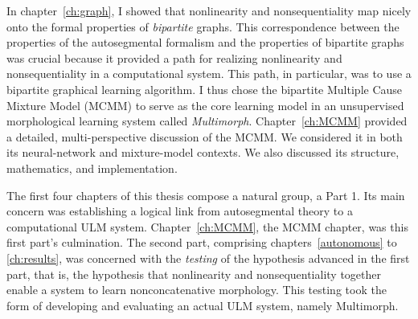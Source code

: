 In chapter~\ref{ch:graph}, I showed that nonlinearity 
and nonsequentiality map nicely onto the formal properties of \emph{bipartite} graphs.
This correspondence between the properties of the autosegmental formalism and the properties of bipartite graphs was crucial because it provided a path for realizing nonlinearity 
and nonsequentiality in a computational system. This path, in particular, was to use a bipartite graphical learning algorithm. I thus chose the bipartite Multiple Cause Mixture Model (MCMM) \citep{saund:94} to serve as the core learning model in an unsupervised morphological learning system called \emph{Multimorph}. Chapter~\ref{ch:MCMM} provided a detailed, multi-perspective discussion of the MCMM. We considered it  in both
its neural-network and mixture-model contexts. We also discussed its structure, mathematics, and implementation.

The first four chapters of this thesis compose a natural group, a Part 1. Its main concern was
 establishing a logical link from autosegmental theory to a computational ULM system. Chapter~\ref{ch:MCMM}, the MCMM chapter,
 was this first part's culmination. 
The second part, %
comprising chapters~\ref{autonomous} to \ref{ch:results}, was concerned with the \emph{testing} of the hypothesis advanced in the first part, that is, the hypothesis that nonlinearity and nonsequentiality together 
enable a system to learn nonconcatenative morphology.
This testing took the form of developing and evaluating an actual ULM system, namely Multimorph. 

